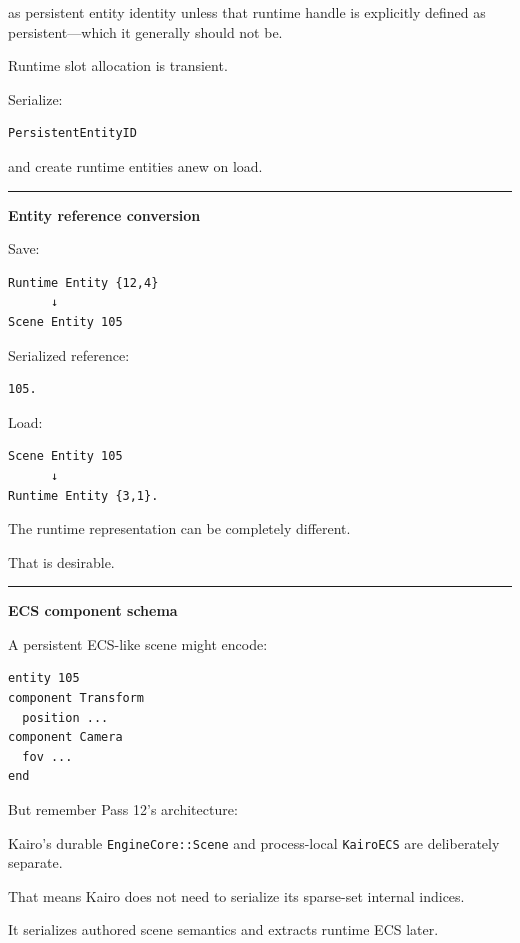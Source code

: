 as persistent entity identity unless that runtime handle is explicitly defined as persistent---which it generally should not be.

Runtime slot allocation is transient.

Serialize:

\begin{verbatim}
PersistentEntityID
\end{verbatim}

and create runtime entities anew on load.

\begin{center}\rule{0.5\linewidth}{0.5pt}\end{center}

\textbf{Entity reference conversion}

Save:

\begin{verbatim}
Runtime Entity {12,4}
      ↓
Scene Entity 105
\end{verbatim}

Serialized reference:

\begin{verbatim}
105.
\end{verbatim}

Load:

\begin{verbatim}
Scene Entity 105
      ↓
Runtime Entity {3,1}.
\end{verbatim}

The runtime representation can be completely different.

That is desirable.

\begin{center}\rule{0.5\linewidth}{0.5pt}\end{center}

\textbf{ECS component schema}

A persistent ECS-like scene might encode:

\begin{verbatim}
entity 105
component Transform
  position ...
component Camera
  fov ...
end
\end{verbatim}

But remember Pass 12's architecture:

Kairo's durable \texttt{EngineCore::Scene} and process-local \texttt{KairoECS} are deliberately separate.

That means Kairo does not need to serialize its sparse-set internal indices.

It serializes authored scene semantics and extracts runtime ECS later.

